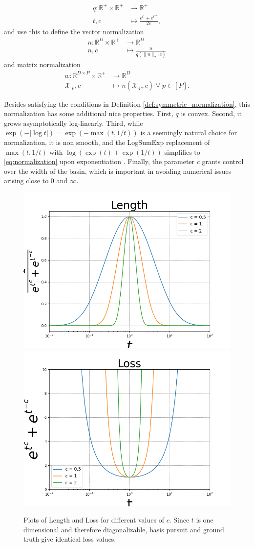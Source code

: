 \begin{align}
\label{eq:normalization}
q: \mathbb R^+ \times \mathbb R^+  &\to \mathbb R^+ \\
t , c &\mapsto \frac{e^{t^c} + e^{t^{-c}}}{2e},
\end{align}
and use this to define the vector normalization 
\begin{align}
n: \mathbb R^D \times \mathbb R^+ &\to \mathbb R^D \\
n , c &\mapsto \frac{n}{q(\|n\|_{2},c) }
\end{align}
and matrix normalization
\begin{align}
w: \mathbb R^{D \times P} \times \mathbb R^+ &\to \mathbb R^D \\
\mathcal X_{.p} , c &\mapsto n(\mathcal X_{.p}, c) \; \forall \; p \in [P].
\end{align}

Besides satisfying the conditions in Definition \ref{def:symmetric_normalization}, this normalization has some additional nice properties.
First, $q$ is convex.
Second, it grows asymptotically log-linearly.
Third, while $\exp(-|\log t|) = \exp(-\max (t, 1/t))$ is a seemingly natural choice for normalization, it is non smooth, and the LogSumExp replacement of $\max (t, 1/t)$ with $ \log (\exp (t ) + \exp(1/t))$ simplifies to \ref{eq:normalization} upon exponentiation \citep{Boyd2004-ql}.
Finally, the parameter $c$ grants control over the width of the basin, which is important in avoiding numerical issues arising close to $0$ and $\infty$.

\begin{figure}
\centering
{}
{\includegraphics[width = .33\textwidth]{../figures/Figure_1a.png}}
{\includegraphics[width = .33\textwidth]{../figures/Figure_1b.png}}
\caption{Plots of Length and Loss for different values of $c$.
   Since $t$ is one dimensional and therefore diagonalizable, basis pursuit and ground truth give identical loss values.}\label{animals}
\end{figure}

